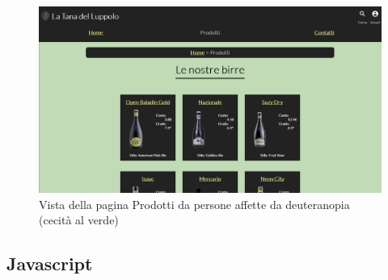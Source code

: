 \begin{figure}[H]
	\centering
	\includegraphics[width=16cm]{utility/prodotti_deuteranopia.png}
	\caption{Vista della pagina Prodotti da persone affette da deuteranopia (cecità al verde)}
\end{figure}


\subsection{Javascript}
